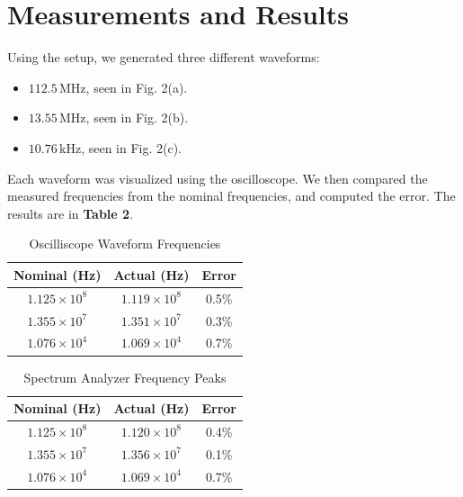 \documentclass[lettersize,journal]{IEEEtran}
\begin{document}
\section{Measurements and Results}

Using the setup, we generated three different waveforms:

\begin{itemize}
    \item $112.5\,\text{MHz}$, seen in Fig. 2(a).
    \item $13.55\,\text{MHz}$, seen in Fig. 2(b).
    \item $10.76\,\text{kHz}$, seen in Fig. 2(c).
\end{itemize}

Each waveform was visualized using the oscilloscope. We then compared the measured frequencies from the nominal frequencies, and computed the error. The results are in {\bf{Table 2}}.

\begin{table}
\renewcommand{\arraystretch}{2.2}
\begin{center}
\caption{Oscilliscope Waveform Frequencies}
\label{tab1}
\begin{tabular}{c c c}
\hline
\bfseries Nominal (Hz) & \bfseries Actual (Hz) & \bfseries Error\\
\hline
$1.125 \times 10^{8}$ & $1.119 \times 10^{8} $ & 0.5\%\\
\hline
$1.355 \times 10^{7}$ & $1.351 \times 10^{7}$ & 0.3\%\\ 
\hline
$1.076 \times 10^{4}$ & $1.069 \times 10^{4}$ & 0.7\%\\
\hline
\end{tabular}
\end{center}
\end{table}

\begin{table}
\renewcommand{\arraystretch}{2.2}
\begin{center}
\caption{Spectrum Analyzer Frequency Peaks}
\label{tab1}
\begin{tabular}{c c c}
\hline
\bfseries Nominal (Hz) & \bfseries Actual (Hz) & \bfseries Error\\
\hline
$1.125 \times 10^{8}$ & $1.120 \times 10^{8} $ & 0.4\%\\
\hline
$1.355 \times 10^{7}$ & $1.356 \times 10^{7}$ & 0.1\%\\ 
\hline
$1.076 \times 10^{4}$ & $1.069 \times 10^{4}$ & 0.7\%\\
\hline
\end{tabular}
\end{center}
\end{table}
\end{document}

